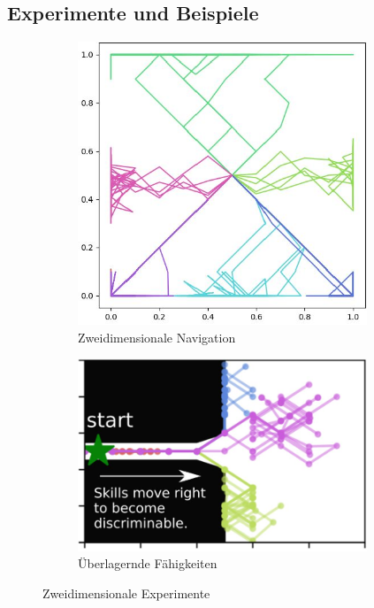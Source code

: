 \subsection{Experimente und Beispiele}
\label{sec:examplesdiversity}
\begin{figure}[h]
\begin{subfigure}{0.41\textwidth}
\includegraphics[width=0.95\textwidth]{images/example_diayn_1.JPG}
\caption{Zweidimensionale Navigation} \label{img:diayn_ex1}
\end{subfigure}
\begin{subfigure}{0.59\textwidth}
\includegraphics[width=0.95\textwidth, right]{images/example_diayn_2.JPG}
\caption{Überlagernde Fähigkeiten} \label{img:diayn_ex2}
\end{subfigure}
\caption{Zweidimensionale Experimente} \label{img:diayn_ex}
\end{figure}

